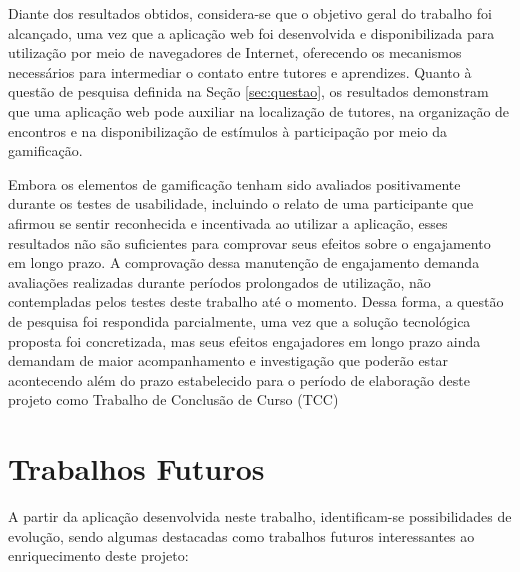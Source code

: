 Diante dos resultados obtidos, considera-se que o objetivo geral do trabalho foi alcançado, uma vez que a aplicação web foi desenvolvida e disponibilizada para utilização por meio de navegadores de Internet, oferecendo os mecanismos necessários para intermediar o contato entre tutores e aprendizes. Quanto à questão de pesquisa definida na Seção \ref{sec:questao}, os resultados demonstram que uma aplicação web pode auxiliar na localização de tutores, na organização de encontros e na disponibilização de estímulos à participação por meio da gamificação.

Embora os elementos de gamificação tenham sido avaliados positivamente durante os testes de usabilidade, incluindo o relato de uma participante que afirmou se sentir reconhecida e incentivada ao utilizar a aplicação, esses resultados não são suficientes para comprovar seus efeitos sobre o engajamento em longo prazo. A comprovação dessa manutenção de engajamento demanda avaliações realizadas durante períodos prolongados de utilização, não contempladas pelos testes deste trabalho até o momento. Dessa forma, a questão de pesquisa foi respondida parcialmente, uma vez que a solução tecnológica proposta foi concretizada, mas seus efeitos engajadores em longo prazo ainda demandam de maior acompanhamento e investigação que poderão estar acontecendo além do prazo estabelecido para o período de elaboração deste projeto como Trabalho de Conclusão de Curso (TCC)

\section[Trabalhos Futuros]{Trabalhos Futuros}

A partir da aplicação desenvolvida neste trabalho, identificam-se possibilidades de evolução, sendo algumas destacadas como trabalhos futuros interessantes ao enriquecimento deste projeto:


